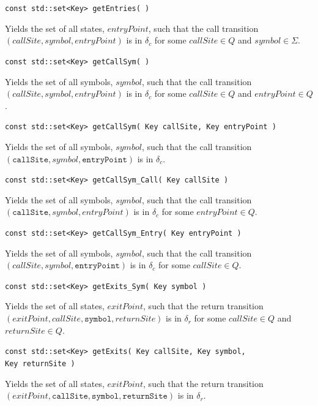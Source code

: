 \documentclass{llncs}
\begin{document}
\begin{description}
  \item\texttt{const std::set<Key> getEntries( )} \nopagebreak

    Yields the set of all states, $entryPoint$, such that the call transition $(callSite,symbol,entryPoint)$ is in $\delta_c$ for some $callSite \in Q$ and $symbol \in \Sigma$.

  \item\texttt{const std::set<Key> getCallSym( )} \nopagebreak

    Yields the set of all symbols, $symbol$, such that the call transition $(callSite,symbol,entryPoint)$ is in $\delta_c$ for some $callSite \in Q$ and $entryPoint \in Q$.

  \item\texttt{const std::set<Key> getCallSym( Key callSite, Key entryPoint )} \nopagebreak

    Yields the set of all symbols, $symbol$, such that the call transition $(\texttt{callSite},symbol,\texttt{entryPoint})$ is in $\delta_c$.

  \item\texttt{const std::set<Key> getCallSym\_Call( Key callSite )} \nopagebreak

    Yields the set of all symbols, $symbol$, such that the call transition $(\texttt{callSite},symbol,entryPoint)$ is in $\delta_c$ for some $entryPoint \in Q$.

  \item\texttt{const std::set<Key> getCallSym\_Entry( Key entryPoint )} \nopagebreak

    Yields the set of all symbols, $symbol$, such that the call transition $(callSite,symbol,\texttt{entryPoint})$ is in $\delta_c$ for some $callSite \in Q$.

  \item\texttt{const std::set<Key> getExits\_Sym( Key symbol )} \nopagebreak

    Yields the set of all states, $exitPoint$, such that the return transition $(exitPoint,callSite,\texttt{symbol},returnSite)$ is in $\delta_r$ for some $callSite \in Q$ and $returnSite \in Q$.

  \item\texttt{const std::set<Key> getExits( Key callSite, Key symbol,\\ \hspace*{3.25cm} Key returnSite )} \nopagebreak

    Yields the set of all states, $exitPoint$, such that the return transition $(exitPoint,\texttt{callSite},\texttt{symbol},\texttt{returnSite})$ is in $\delta_r$.


\end{description}
\end{document}
